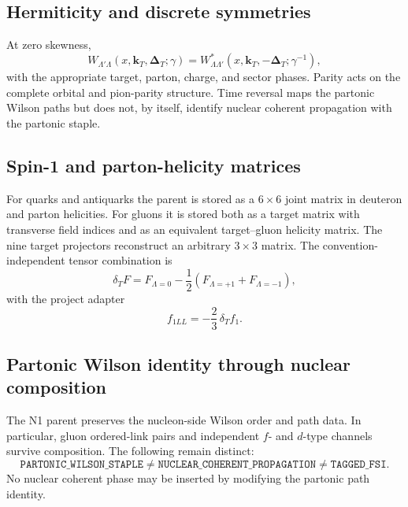\documentclass[11pt]{article}
\newcommand{\kT}{\bm{k}_{T}}
\newcommand{\DT}{\bm{\Delta}_{T}}
\begin{document}
\subsection{Hermiticity and discrete symmetries}

At zero skewness,
\begin{equation}
 W_{\Lambda'\Lambda}(x,\kT,\DT;\gamma)
 =
 W_{\Lambda\Lambda'}^{*}
 (x,\kT,-\DT;\gamma^{-1}),
 \label{eq:n1-hermiticity}
\end{equation}
with the appropriate target, parton, charge, and sector phases.  Parity acts
on the complete orbital and pion-parity structure.  Time reversal maps the
partonic Wilson paths but does not, by itself, identify nuclear coherent
propagation with the partonic staple.

\subsection{Spin-1 and parton-helicity matrices}

For quarks and antiquarks the parent is stored as a \(6\times6\) joint matrix
in deuteron and parton helicities.  For gluons it is stored both as a target
matrix with transverse field indices and as an equivalent target--gluon
helicity matrix.  The nine target projectors reconstruct an arbitrary
\(3\times3\) matrix.  The convention-independent tensor combination is
\begin{equation}
 \delta_TF
 =F_{\Lambda=0}
 -\frac12\left(F_{\Lambda=+1}+F_{\Lambda=-1}\right),
 \label{eq:n1-deltaT}
\end{equation}
with the project adapter
\begin{equation}
 f_{1LL}=-\frac23\,\delta_Tf_1.
 \label{eq:n1-f1ll}
\end{equation}

\subsection{Partonic Wilson identity through nuclear composition}

The N1 parent preserves the nucleon-side Wilson order and path data.  In
particular, gluon ordered-link pairs and independent \(f\)- and \(d\)-type
channels survive composition.  The following remain distinct:
\begin{equation}
 \texttt{PARTONIC\_WILSON\_STAPLE}
 \neq
 \texttt{NUCLEAR\_COHERENT\_PROPAGATION}
 \neq
 \texttt{TAGGED\_FSI}.
 \label{eq:three-rescattering-types}
\end{equation}
No nuclear coherent phase may be inserted by modifying the partonic path
identity.
\end{document}
